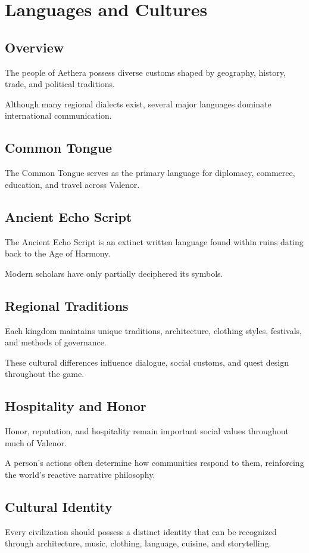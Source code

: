 \chapter{Languages and Cultures}

\section{Overview}

The people of Aethera possess diverse customs shaped by geography, history, trade, and political traditions.

Although many regional dialects exist, several major languages dominate international communication.

\section{Common Tongue}

The Common Tongue serves as the primary language for diplomacy, commerce, education, and travel across Valenor.

\section{Ancient Echo Script}

The Ancient Echo Script is an extinct written language found within ruins dating back to the Age of Harmony.

Modern scholars have only partially deciphered its symbols.

\section{Regional Traditions}

Each kingdom maintains unique traditions, architecture, clothing styles, festivals, and methods of governance.

These cultural differences influence dialogue, social customs, and quest design throughout the game.

\section{Hospitality and Honor}

Honor, reputation, and hospitality remain important social values throughout much of Valenor.

A person's actions often determine how communities respond to them, reinforcing the world's reactive narrative philosophy.

\section{Cultural Identity}

Every civilization should possess a distinct identity that can be recognized through architecture, music, clothing, language, cuisine, and storytelling.